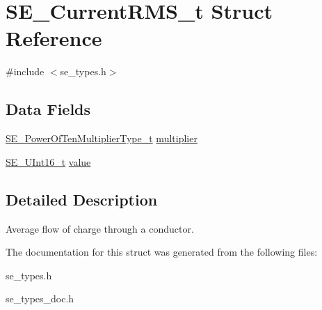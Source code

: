 \hypertarget{structSE__CurrentRMS__t}{}\section{S\+E\+\_\+\+Current\+R\+M\+S\+\_\+t Struct Reference}
\label{structSE__CurrentRMS__t}


{\ttfamily \#include $<$se\+\_\+types.\+h$>$}

\subsection*{Data Fields}
\begin{DoxyCompactItemize}
\item 
\hyperlink{group__PowerOfTenMultiplierType_gaf0317b781dc8dbb9cb6ac4e44a14fdef}{S\+E\+\_\+\+Power\+Of\+Ten\+Multiplier\+Type\+\_\+t} \hyperlink{group__CurrentRMS_gac4c5d99f23cf05c7dceadc6db6f17591}{multiplier}
\item 
\hyperlink{group__UInt16_gac68d541f189538bfd30cfaa712d20d29}{S\+E\+\_\+\+U\+Int16\+\_\+t} \hyperlink{group__CurrentRMS_ga37b6aaf021db943b1c3e4cee427b7725}{value}
\end{DoxyCompactItemize}


\subsection{Detailed Description}
Average flow of charge through a conductor. 

The documentation for this struct was generated from the following files\+:\begin{DoxyCompactItemize}
\item 
se\+\_\+types.\+h\item 
se\+\_\+types\+\_\+doc.\+h\end{DoxyCompactItemize}
